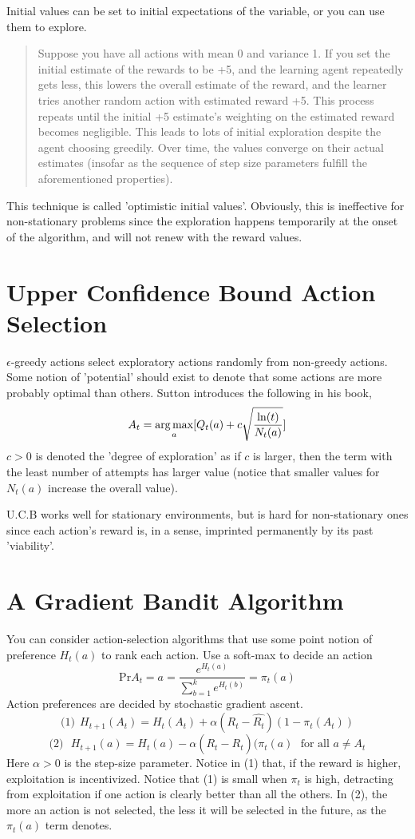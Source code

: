 \documentclass[a4paper]{report}
\begin{document}
Initial values can be set to initial expectations of the variable, or you can use them to explore.

\begin{quote}  
Suppose you have all actions with mean 0 and variance 1. If you set the initial estimate of the rewards to be +5, and the learning agent repeatedly gets less, this lowers the overall estimate of the reward, and the learner tries another random action with estimated reward +5. This process repeats until the initial +5 estimate's weighting on the estimated reward becomes negligible. This leads to lots of initial exploration despite the agent choosing greedily. Over time, the values converge on their actual estimates (insofar as the sequence of step size parameters fulfill the aforementioned properties).
\end{quote}

This technique is called 'optimistic initial values'. Obviously, this is ineffective for non-stationary problems since the exploration happens temporarily at the onset of the algorithm, and will not renew with the reward values.

\section{Upper Confidence Bound Action Selection}
$\epsilon$-greedy actions select exploratory actions randomly from non-greedy actions. Some notion of 'potential' should exist to denote that some actions are more probably optimal than others. Sutton introduces the following in his book, $$A_t = \operatorname*{arg\,max}_a[Q_t(a) + c\sqrt{\frac{\ln(t)}{N_t(a)}}]$$ $c > 0$ is denoted the 'degree of exploration' as if $c$ is larger, then the term with the least number of attempts has larger value (notice that smaller values for $N_t(a)$ increase the overall value).

U.C.B works well for stationary environments, but is hard for non-stationary ones since each action's reward is, in a sense, imprinted permanently by its past 'viability'.

\section{A Gradient Bandit Algorithm}
You can consider action-selection algorithms that use some point notion of preference $H_t(a)$ to rank each action. Use a soft-max to decide an action 
$$\text{Pr}{A_t=a} = \frac{e^{H_t(a)}}{\sum_{b=1}^k e^{H_t(b)}} = \pi_t(a)$$ 
Action preferences are decided by stochastic gradient ascent. 
$$\text{(1)}~~H_{t+1}(A_t) = H_t(A_t) + \alpha(R_t - \hat{R_t})(1-\pi_t(A_t))$$ 
$$\text{(2)}~~~H_{t+1}(a) = H_t(a) - \alpha(R_t - \hat{R_t})(\pi_t(a)~~~\text{for all $a \neq A_t$}$$
Here $\alpha > 0$ is the step-size parameter. Notice in (1) that, if the reward is higher, exploitation is incentivized. Notice that (1) is small when $\pi_t$ is high, detracting from exploitation if one action is clearly better than all the others. In (2), the more an action is not selected, the less it will be selected in the future, as the $\pi_t(a)$ term denotes.
\end{document}
